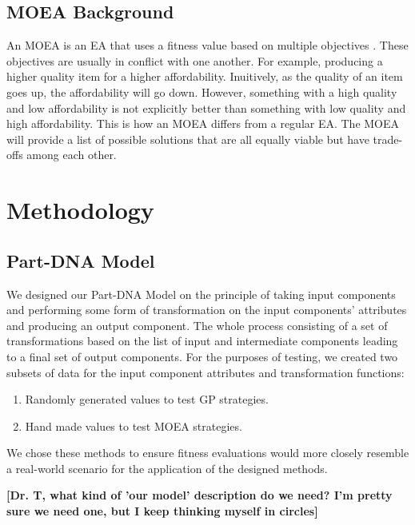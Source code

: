 \documentclass{IEEEtran}
\begin{document}
\subsection{MOEA Background}
An MOEA is an EA that uses a fitness value based on multiple objectives \cite{b3}. These objectives are usually in conflict with one another. For example, producing a higher quality item for a higher affordability. Inuitively, as the quality of an item goes up, the affordability will go down. However, something with a high quality and low affordability is not explicitly better than something with low quality and high affordability. This is how an MOEA differs from a regular EA. The MOEA will provide a list of possible solutions that are all equally viable but have trade-offs among each other.

\section{Methodology}
\subsection{Part-DNA Model}
We designed our Part-DNA Model on the principle of taking input components and performing some form of transformation on the input components' attributes and producing an output component. The whole process consisting of a set of transformations based on the list of input and intermediate components leading to a final set of output components. For the purposes of testing, we created two subsets of data for the input component attributes and transformation functions:
\begin{enumerate}
\item Randomly generated values to test GP strategies.
\item Hand made values to test MOEA strategies.
\end{enumerate}
We chose these methods to ensure fitness evaluations would more closely resemble a real-world scenario for the application of the designed methods.


\textbf{[Dr. T,  what kind of 'our model' description do we need? I'm pretty sure we need one, but I keep thinking myself in circles]}

\end{document}
